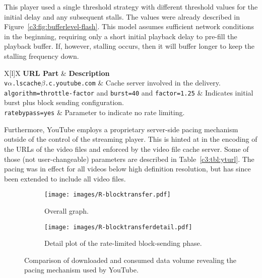 This player used a single threshold strategy with different threshold values for the initial delay and any subsequent stalls. The values were already described in Figure~\ref{c3:fig:bufferlevel-flash}. This model assumes sufficient network conditions in the beginning, requiring only a short initial playback delay to pre-fill the playback buffer. If, however, stalling occurs, then it will buffer longer to keep the stalling frequency down.

\begin{table}[htb]
\caption{Transmission related parameters from YouTube's video URL setup.}
\label{c3:tbl:yturl}
	\centering
	\begin{tabu}{X[l]X}
		\toprule
		\textbf{\gls{URL} Part} & \textbf{Description} \\ 
		\midrule
		\texttt{v$\alpha$.lscache$\beta$.c.youtube.com} &  Cache server involved in the delivery.\\
		\texttt{algorithm=throttle-factor} and \texttt{burst=40} and \texttt{factor=1.25} & Indicates initial burst plus block sending configuration. \\
		\texttt{ratebypass=yes} & Parameter to indicate no rate limiting.\\
		\bottomrule
	\end{tabu}
\end{table}

Furthermore, YouTube employs a proprietary server-side pacing mechanism outside of the control of the streaming player. This is hinted at in the encoding of the \glspl{URL} of the video files and enforced by the video file cache server. Some of those (not user-changeable) parameters are described in Table~\ref{c3:tbl:yturl}. The pacing was in effect for all videos below high definition resolution, but has since been extended to include all video files. 

\begin{figure}[htbp]
	\centering
	\begin{subfigure}[b]{0.9\textwidth}
		\centering
		\texttt{[image: images/R-blocktransfer.pdf]}
		\caption{Overall graph.}
		\label{c3:fig:blocktransfer-overall}
	\end{subfigure}

	\begin{subfigure}[b]{0.9\textwidth}
		\centering
		\texttt{[image: images/R-blocktransferdetail.pdf]}
		\caption{Detail plot of the rate-limited block-sending phase.}
		\label{c3:fig:blocktransfer-detail}
	\end{subfigure}
\caption{Comparison of downloaded and consumed data volume revealing the pacing mechanism used by YouTube.}
\label{c3:fig:blocktransfer}
\end{figure}

